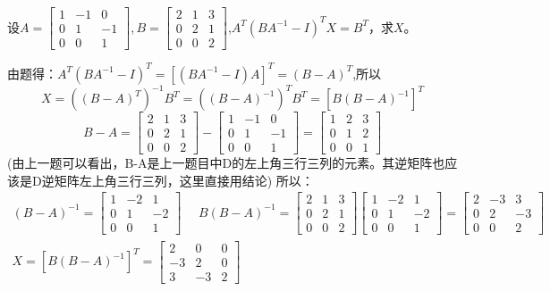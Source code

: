 \documentclass{article}
\begin{document}
设$
A=
\begin{bmatrix}
  1 & -1 & 0 \\
  0 & 1 & -1\\
  0 & 0 & 1
\end{bmatrix},B=
\begin{bmatrix}
  2 & 1 & 3 \\
  0 & 2 & 1\\
  0 & 0 & 2
\end{bmatrix}
$,$A^{T}(BA^{-1}-I)^{T}X=B^{T}$，求$X$。

\begin{jie}
由题得：$A^{T}(BA^{-1}-I)^{T}=[(BA^{-1}-I)A]^{T}=(B-A)^{T}$,所以
\begin{equation*}
  X=((B-A)^{T})^{-1}B^{T}=((B-A)^{-1})^{T}B^{T}=[B(B-A)^{-1}]^{T}
\end{equation*}
\begin{equation*}
  B-A=\begin{bmatrix}
  2 & 1 & 3 \\
  0 & 2 & 1\\
  0 & 0 & 2
\end{bmatrix}-\begin{bmatrix}
  1 & -1 & 0 \\
  0 & 1 & -1\\
  0 & 0 & 1
\end{bmatrix}=
\begin{bmatrix}
  1 & 2 & 3 \\
  0 & 1 & 2\\
  0 & 0 & 1
\end{bmatrix}
\end{equation*}
(\textcolor[rgb]{0.00,1.00,0.50}{由上一题可以看出，B-A是上一题目中D的左上角三行三列的元素。其逆矩阵也应该是D逆矩阵左上角三行三列，这里直接用结论})
所以：
\begin{gather*}
( B-A)^{-1}=\begin{bmatrix}
  1 & -2 & 1 \\
  0 & 1 & -2 \\
  0 & 0 & 1
\end{bmatrix}~~~~~~
B( B-A)^{-1}=\begin{bmatrix}
  2 & 1 & 3 \\
  0 & 2 & 1\\
  0 & 0 & 2
\end{bmatrix}\begin{bmatrix}
  1 & -2 & 1 \\
  0 & 1 & -2 \\
  0 & 0 & 1
\end{bmatrix}=
\begin{bmatrix}
  2 & -3 & 3 \\
  0 & 2 & -3 \\
  0 & 0 & 2
\end{bmatrix}\\
X=\left[B(B-A)^{-1}\right]^{T}=
\begin{bmatrix}
  2 & 0 & 0 \\
  -3 & 2 & 0\\
  3 & -3 & 2
\end{bmatrix}
\end{gather*}
\end{jie}
\end{document}
